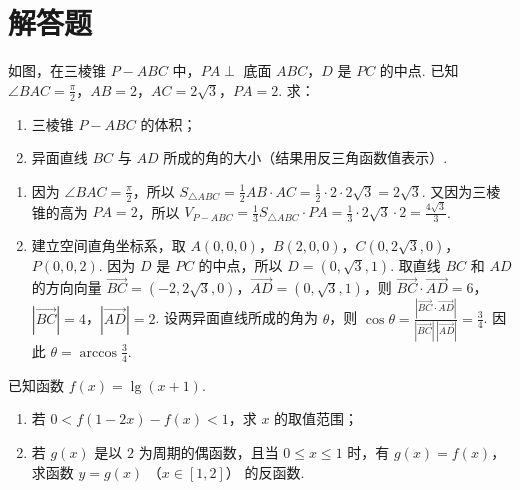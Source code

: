 \section{解答题}

\begin{problem}
如图，在三棱锥 \(P - ABC\) 中，\(PA \perp\) 底面 \(ABC\)，\(D\) 是 \(PC\) 的中点. 已知 \(\angle BAC = \frac{\pi}{2}\)，\(AB = 2\)，\(AC = 2\sqrt{3}\)，\(PA = 2\). 求：
\begin{enumerate}
\item 三棱锥 \(P - ABC\) 的体积；
\item 异面直线 \(BC\) 与 \(AD\) 所成的角的大小（结果用反三角函数值表示）.
\end{enumerate}

\end{problem}

\begin{solution}
\begin{enumerate}
\item 因为 \(\angle BAC=\frac{\pi}{2}\)，所以 \(S_{\triangle ABC}=\frac12 AB\cdot AC=\frac12\cdot2\cdot2\sqrt3=2\sqrt3\). 又因为三棱锥的高为 \(PA=2\)，所以 \(V_{P-ABC}=\frac13S_{\triangle ABC}\cdot PA=\frac13\cdot2\sqrt3\cdot2=\frac{4\sqrt3}{3}\).
\item 建立空间直角坐标系，取 \(A(0,0,0)\)，\(B(2,0,0)\)，\(C(0,2\sqrt3,0)\)，\(P(0,0,2)\). 因为 \(D\) 是 \(PC\) 的中点，所以 \(D=(0,\sqrt3,1)\). 取直线 \(BC\) 和 \(AD\) 的方向向量 \(\overrightarrow{BC}=(-2,2\sqrt3,0)\)，\(\overrightarrow{AD}=(0,\sqrt3,1)\)，则 \(\overrightarrow{BC}\cdot\overrightarrow{AD}=6\)，\(|\overrightarrow{BC}|=4\)，\(|\overrightarrow{AD}|=2\). 设两异面直线所成的角为 \(\theta\)，则 \(\cos\theta=\frac{|\overrightarrow{BC}\cdot\overrightarrow{AD}|}{|\overrightarrow{BC}|\,|\overrightarrow{AD}|}=\frac{3}{4}\). 因此 \(\theta=\arccos\frac34\).
\end{enumerate}
\end{solution}

\begin{problem}
已知函数 \(f(x) = \lg (x + 1)\).
\begin{enumerate}
\item 若 \(0 < f(1 - 2x) - f(x) < 1\)，求 \(x\) 的取值范围；
\item 若 \(g(x)\) 是以 \(2\) 为周期的偶函数，且当 \(0 \leqslant x \leqslant 1\) 时，有 \(g(x) = f(x)\)，求函数 \(y = g(x)\) （\(x \in [1,2]\)） 的反函数.
\end{enumerate}
\end{problem}

